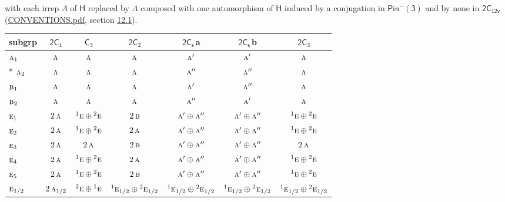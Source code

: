 \documentclass[10pt,a4paper]{article}
\numberwithin{equation}{section}
\newcommand{\grp}[1]{\mathsf{#1}}
\newcommand{\irr}[1]{\text{\normalfont\scshape #1}}
\newcommand{\conjpair}[1]{{}^{#1}}
\newcommand{\clsletter}[1]{\,{\scriptsize\color{black!55}#1}}
\begin{document}
with each irrep $\Lambda$ of $\grp{H}$ replaced by $\Lambda$ composed with one automorphism of $\grp{H}$ induced by a conjugation in \href{Pinminus3.pdf}{$\grp{Pin^{-}(3)}$} and by none in $\grp{2C_{12v}}$ (\href{../../CONVENTIONS.pdf}{CONVENTIONS.pdf}, section \href{../../../rotation/CONVENTIONS.pdf\#conv.12.1}{12.1}).
{\small\begin{longtable}{@{}lcccccc@{}}\toprule
subgrp & \href{2C1.pdf}{$\grp{2C_{1}}$} & \href{C3.pdf}{$\grp{C_{3}}$} & \href{2C2.pdf}{$\grp{2C_{2}}$} & \href{2C1v.pdf}{$\grp{2C_{s}}$}\clsletter{a} & \href{2C1v.pdf}{$\grp{2C_{s}}$}\clsletter{b} & \href{2C3.pdf}{$\grp{2C_{3}}$}\\\midrule\endhead
\bottomrule\endfoot\endlastfoot
$\irr{a}_{1}$ & $\irr{a}$ & $\irr{a}$ & $\irr{a}$ & $\irr{a}'$ & $\irr{a}'$ & $\irr{a}$\\*
$\irr{a}_{2}$ & $\irr{a}$ & $\irr{a}$ & $\irr{a}$ & $\irr{a}''$ & $\irr{a}''$ & $\irr{a}$\\
$\irr{b}_{1}$ & $\irr{a}$ & $\irr{a}$ & $\irr{a}$ & $\irr{a}'$ & $\irr{a}''$ & $\irr{a}$\\
$\irr{b}_{2}$ & $\irr{a}$ & $\irr{a}$ & $\irr{a}$ & $\irr{a}''$ & $\irr{a}'$ & $\irr{a}$\\
$\irr{e}_{1}$ & $2\,\irr{a}$ & $\conjpair{1}\irr{e}\oplus \conjpair{2}\irr{e}$ & $2\,\irr{b}$ & $\irr{a}'\oplus \irr{a}''$ & $\irr{a}'\oplus \irr{a}''$ & $\conjpair{1}\irr{e}\oplus \conjpair{2}\irr{e}$\\
$\irr{e}_{2}$ & $2\,\irr{a}$ & $\conjpair{1}\irr{e}\oplus \conjpair{2}\irr{e}$ & $2\,\irr{a}$ & $\irr{a}'\oplus \irr{a}''$ & $\irr{a}'\oplus \irr{a}''$ & $\conjpair{1}\irr{e}\oplus \conjpair{2}\irr{e}$\\
$\irr{e}_{3}$ & $2\,\irr{a}$ & $2\,\irr{a}$ & $2\,\irr{b}$ & $\irr{a}'\oplus \irr{a}''$ & $\irr{a}'\oplus \irr{a}''$ & $2\,\irr{a}$\\
$\irr{e}_{4}$ & $2\,\irr{a}$ & $\conjpair{1}\irr{e}\oplus \conjpair{2}\irr{e}$ & $2\,\irr{a}$ & $\irr{a}'\oplus \irr{a}''$ & $\irr{a}'\oplus \irr{a}''$ & $\conjpair{1}\irr{e}\oplus \conjpair{2}\irr{e}$\\
$\irr{e}_{5}$ & $2\,\irr{a}$ & $\conjpair{1}\irr{e}\oplus \conjpair{2}\irr{e}$ & $2\,\irr{b}$ & $\irr{a}'\oplus \irr{a}''$ & $\irr{a}'\oplus \irr{a}''$ & $\conjpair{1}\irr{e}\oplus \conjpair{2}\irr{e}$\\
$\irr{e}_{1/2}$ & $2\,\irr{a}_{1/2}$ & $\conjpair{2}\irr{e}\oplus \conjpair{1}\irr{e}$ & $\conjpair{1}\irr{e}_{1/2}\oplus \conjpair{2}\irr{e}_{1/2}$ & $\conjpair{1}\irr{e}_{1/2}\oplus \conjpair{2}\irr{e}_{1/2}$ & $\conjpair{1}\irr{e}_{1/2}\oplus \conjpair{2}\irr{e}_{1/2}$ & $\conjpair{1}\irr{e}_{1/2}\oplus \conjpair{2}\irr{e}_{1/2}$\\

\end{longtable}}
\end{document}
